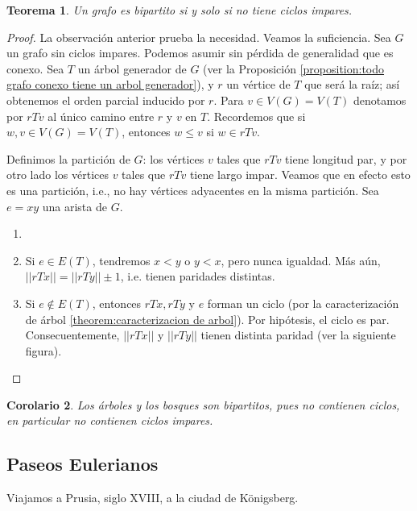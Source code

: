 \documentclass[12pt]{report}
\theoremstyle{plain}
\newtheorem{theorem}{Teorema}[section]
\newtheorem{corollary}[theorem]{Corolario}
\theoremstyle{definition}
\newenvironment{Theorem}{\colorlet{shadecolor}{OliveGreen!18} \begin{shaded} \begin{theorem}}{ \end{theorem} \end{shaded}}
\newcommand{\Abs}[1]{\left \vert \left \vert #1 \right \vert \right \vert}
\begin{document}
\begin{Theorem}
Un grafo es bipartito si y solo si no tiene ciclos impares.
\end{Theorem}
\begin{proof}
La observación anterior prueba la necesidad. Veamos la suficiencia. Sea $G$ un grafo sin ciclos impares. Podemos asumir sin pérdida de generalidad que es conexo. Sea $T$ un árbol generador de $G$ (ver la Proposición \ref{proposition:todo grafo conexo tiene un arbol generador}), y $r$ un vértice de $T$ que será la raíz; así obtenemos el orden parcial inducido por $r$. Para $v \in V(G) = V(T)$ denotamos por $rTv$ al único camino entre $r$ y $v$ en $T$. Recordemos que si $w,v \in V(G) = V(T)$, entonces $w \leq v$ si $w \in rTv$.

Definimos la partición de $G$: los vértices $v$ tales que $rTv$ tiene longitud par, y por otro lado los vértices $v$ tales que $rTv$ tiene largo impar. Veamos que en efecto esto es una partición, i.e., no hay vértices adyacentes en la misma partición. Sea $e = xy$ una arista de $G$.\vspace{-0.75cm}
\begin{enumerate}[leftmargin=1.80cm]
\item[]
\item[\textsc{Caso 1:}] Si $e \in E(T)$, tendremos $x < y$ o $y < x$, pero nunca igualdad. Más aún, $\Abs{rTx} = \Abs{rTy} \pm 1$, i.e. tienen paridades distintas.

\item[\textsc{Caso 2:}]  Si $e \not \in E(T)$, entonces $rTx, rTy$ y $e$ forman un ciclo (por la caracterización de árbol \ref{theorem:caracterizacion de arbol}). Por hipótesis, el ciclo es par. Consecuentemente, $\Abs{rTx}$ y $\Abs{rTy}$ tienen distinta paridad (ver la siguiente figura).
\end{enumerate}

\end{proof}

\begin{corollary}
Los árboles y los bosques son bipartitos, pues no contienen ciclos, en particular no contienen ciclos impares.
\end{corollary}


\subsection{Paseos Eulerianos}

Viajamos a Prusia, siglo XVIII, a la ciudad de Königsberg.
\end{document}
